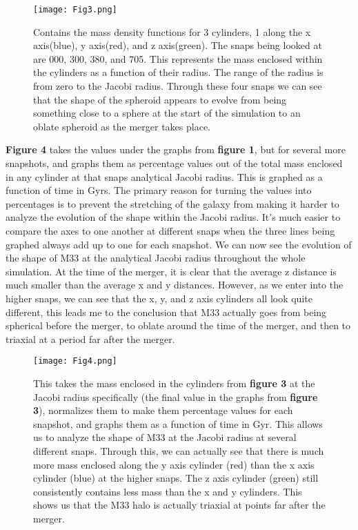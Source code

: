 \documentclass[fleqn,usenatbib]{mnras}
\begin{document}
\begin{figure}
                \centering
                \texttt{[image: Fig3.png]}
                \label{fig:enter-label}
            \caption{Contains the mass density functions for 3 cylinders, 1 along the x axis(blue), y axis(red), and z axis(green). The snaps being looked at are 000, 300, 380, and 705. This represents the mass enclosed within the cylinders as a function of their radius. The range of the radius is from zero to the Jacobi radius. Through these four snaps we can see that the shape of the spheroid appears to evolve from being something close to a sphere at the start of the simulation to an oblate spheroid as the merger takes place.}
            \end{figure}

\textbf{Figure 4} takes the values under the graphs from \textbf{figure 1}, but for several more snapshots, and graphs them as percentage values out of the total mass enclosed in any cylinder at that snaps analytical Jacobi radius. This is graphed as a function of time in Gyrs. The primary reason for turning the values into percentages is to prevent the stretching of the galaxy from making it harder to analyze the evolution of the shape within the Jacobi radius. It’s much easier to compare the axes to one another at different snaps when the three lines being graphed always add up to one for each snapshot. We can now see the evolution of the shape of M33 at the analytical Jacobi radius throughout the whole simulation. At the time of the merger, it is clear that the average z distance is much smaller than the average x and y distances. However, as we enter into the higher snaps, we can see that the x, y, and z axis cylinders all look quite different, this leads me to the conclusion that M33 actually goes from being spherical before the merger, to oblate around the time of the merger, and then to triaxial at a period far after the merger.

\begin{figure}
                \centering
                \texttt{[image: Fig4.png]}
                \label{fig:enter-label}
            \caption{This takes the mass enclosed in the cylinders from \textbf{figure 3} at the Jacobi radius specifically (the final value in the graphs from \textbf{figure 3}), normalizes them to make them percentage values for each snapshot, and graphs them as a function of time in Gyr. This allows us to analyze the shape of M33 at the Jacobi radius at several different snaps. Through this, we can actually see that there is much more mass enclosed along the y axis cylinder (red) than the x axis cylinder (blue) at the higher snaps. The z axis cylinder (green) still consistently contains less mass than the x and y cylinders. This shows us that the M33 halo is actually triaxial at points far after the merger.}
            \end{figure}
\end{document}
